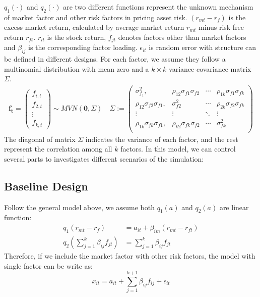 \documentclass[12pt]{article}
\begin{document}
$q_1(\cdot)$ and $q_2(\cdot)$ are two different functions represent the unknown mechanism of market factor and other risk factors in pricing asset risk.
$({r_{mt}}- r_f) $ is the excess market return, calculated by average market  return ${r_{mt}}$ minus risk free return $r_{ft}$. 
$r_{it}$ is the stock return, $f_{jt}$ denotes factors other than market factors and $\beta_{ij}$ is the corresponding factor loading. 
$\epsilon_{it}$ is random error with structure can be defined in different designs.
 For each factor, we assume they follow a multinomial distribution with mean zero and a $k\times k$ variance-covariance matrix $\Sigma$. 
\begin{align*}
\mathbf{f_t} = \begin{pmatrix}
f_{i,t}\\f_{2,t}\\\vdots\\f_{k,t}
\end{pmatrix} \sim MVN(\mathbf{0}, \Sigma) \quad
 \Sigma := 
\begin{pmatrix}
\sigma^2_{f_1}, & \rho_{12}\sigma_{f1}\sigma_{f2} &\cdots  & \rho_{1k}\sigma_{f1}\sigma_{fk}\\
\rho_{12}\sigma_{f2}\sigma_{f1}, & \sigma^2_{f2} &\cdots  & \rho_{2k}\sigma_{f2}\sigma_{fk}\\
\vdots & \vdots & \ddots & \vdots \\
\rho_{1k}\sigma_{fk}\sigma_{f1}, & \rho_{k2}\sigma_{fk}\sigma_{f2} &\cdots  & \sigma^2_{fk}\\
\end{pmatrix}
\end{align*}
The diagonal of matrix $\Sigma$ indicates the variance of each factor, and the rest represent the correlation among all $k$ factors.
In this model, we can control several parts to investigates different scenarios of the simulation:
\subsection{Baseline Design}\label{base}
Follow the general model above, we assume both $q_1(a)$ and $q_2(a)$ are linear function:
\begin{align*}
q_1({r_{mt} - r_f}) &= a_{it} +\beta_{im} (r_{mt} - r_{ft})\\
q_2(\sum_{j = 1}^{k}\beta_{ij}f_{jt}) &=\sum_{j = 1}^{k}\beta_{ij}f_{jt}
\end{align*}
Therefore, if we include the market factor with other risk factors, the model with single factor can be write as:
	\[   x_{it} = a_{it} + \sum_{j = 1}^{k+1}  \beta_{ij}f_{ij} +\epsilon_{it}  \tag{5} \label{singlefactor} \]
\end{document}
